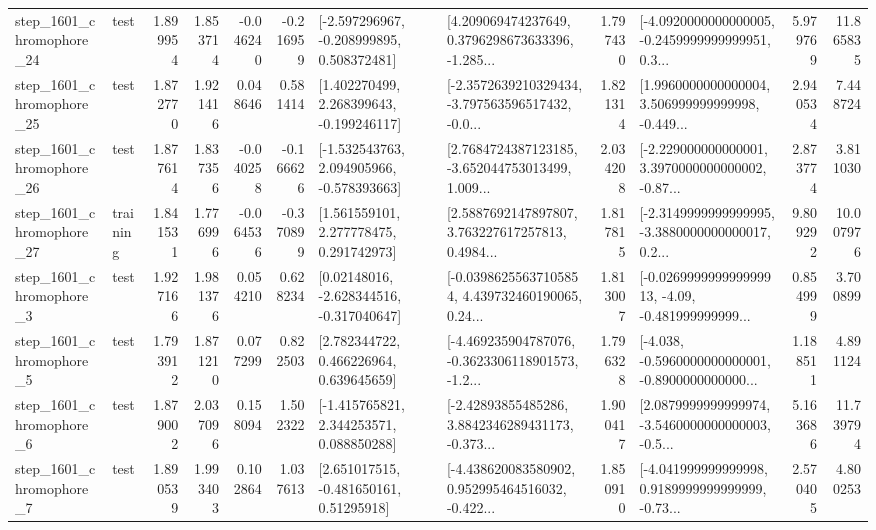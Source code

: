 \begin{tabular}{llrrrrllrlrr}
 step\_1601\_chromophore\_24 &      test &      1.899954 &    1.853714 &     -0.046240 & -0.216959 &   [-2.597296967, -0.208999895, 0.508372481] &  [4.209069474237649, 0.3796298673633396, -1.285... &       1.797430 &  [-4.0920000000000005, -0.2459999999999951, 0.3... &            5.979769 &         11.865835 \\
 step\_1601\_chromophore\_25 &      test &      1.872770 &    1.921416 &      0.048646 &  0.581414 &    [1.402270499, 2.268399643, -0.199246117] &  [-2.3572639210329434, -3.797563596517432, -0.0... &       1.821314 &  [1.9960000000000004, 3.506999999999998, -0.449... &            2.940534 &          7.448724 \\
 step\_1601\_chromophore\_26 &      test &      1.877614 &    1.837356 &     -0.040258 & -0.166626 &   [-1.532543763, 2.094905966, -0.578393663] &  [2.7684724387123185, -3.652044753013499, 1.009... &       2.034208 &  [-2.229000000000001, 3.3970000000000002, -0.87... &            2.873774 &          3.811030 \\
 step\_1601\_chromophore\_27 &  training &      1.841531 &    1.776996 &     -0.064536 & -0.370899 &     [1.561559101, 2.277778475, 0.291742973] &  [2.5887692147897807, 3.763227617257813, 0.4984... &       1.817815 &  [-2.3149999999999995, -3.3880000000000017, 0.2... &            9.809292 &         10.007976 \\
  step\_1601\_chromophore\_3 &      test &      1.927166 &    1.981376 &      0.054210 &  0.628234 &    [0.02148016, -2.628344516, -0.317040647] &  [-0.03986255637105854, 4.439732460190065, 0.24... &       1.813007 &  [-0.026999999999999913, -4.09, -0.481999999999... &            0.854999 &          3.700899 \\
  step\_1601\_chromophore\_5 &      test &      1.793912 &    1.871210 &      0.077299 &  0.822503 &     [2.782344722, 0.466226964, 0.639645659] &  [-4.469235904787076, -0.3623306118901573, -1.2... &       1.796328 &  [-4.038, -0.5960000000000001, -0.8900000000000... &            1.188511 &          4.891124 \\
  step\_1601\_chromophore\_6 &      test &      1.879002 &    2.037096 &      0.158094 &  1.502322 &    [-1.415765821, 2.344253571, 0.088850288] &  [-2.42893855485286, 3.8842346289431173, -0.373... &       1.900417 &  [2.0879999999999974, -3.5460000000000003, -0.5... &            5.163686 &         11.739794 \\
  step\_1601\_chromophore\_7 &      test &      1.890539 &    1.993403 &      0.102864 &  1.037613 &     [2.651017515, -0.481650161, 0.51295918] &  [-4.438620083580902, 0.952995464516032, -0.422... &       1.850910 &  [-4.041999999999998, 0.9189999999999999, -0.73... &            2.570405 &          4.800253 \\

\end{tabular}
